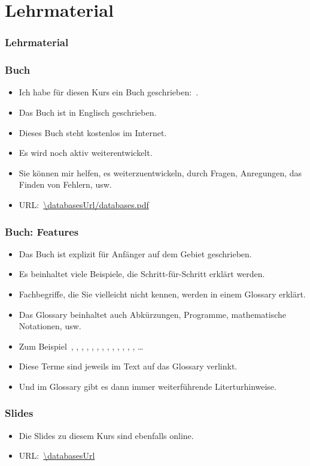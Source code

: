 \documentclass[aspectratio=169,mathserif,notheorems]{beamer}%
\begin{document}
\section{Lehrmaterial}%
%
\begin{frame}%
\frametitle{Lehrmaterial}%
%
\end{frame}%
%
\begin{frame}%
\frametitle{Buch}%
\begin{itemize}%
\item Ich habe für diesen Kurs ein Buch geschrieben:~\cite{databases}.%
\item<2-> Das Buch ist in Englisch geschrieben.%
\item<3-> Dieses Buch steht kostenlos im Internet.%
\item<4-> Es wird noch aktiv weiterentwickelt.%
\item<5-> \alert{Sie} können mir helfen, es weiterzuentwickeln, durch Fragen, Anregungen, das Finden von Fehlern, usw.%
\item<6-> URL:~\expandafter\url{\databasesUrl/databases.pdf}%
\end{itemize}%
\end{frame}%
%
\begin{frame}[t]%
\frametitle{Buch: Features}%
\begin{itemize}%
\item Das Buch ist explizit für Anfänger auf dem Gebiet geschrieben.%
\item<2-> Es beinhaltet viele Beispiele, die Schritt-für-Schritt erklärt werden.%
\item<3-> Fachbegriffe, die Sie vielleicht nicht kennen, werden in einem Glossary erklärt.%
\item<4-> Das Glossary beinhaltet auch Abkürzungen, Programme, mathematische Notationen, usw.%
\item<5-> Zum Beispiel~, , , , , , , , , \realNumbers, \npHard, \psql, \pypi, \matplotlib\dots%
\item<6-> Diese Terme sind jeweils im Text auf das Glossary verlinkt.%
\item<7-> Und im Glossary gibt es dann immer weiterführende Literturhinweise.%
\end{itemize}%
\end{frame}%
%
\begin{frame}%
\frametitle{Slides}%
\begin{itemize}%
\item Die Slides zu diesem Kurs sind ebenfalls online.%
\item<2-> URL:~\expandafter\url{\databasesUrl}%
\end{itemize}%
\end{frame}%
\end{document}
